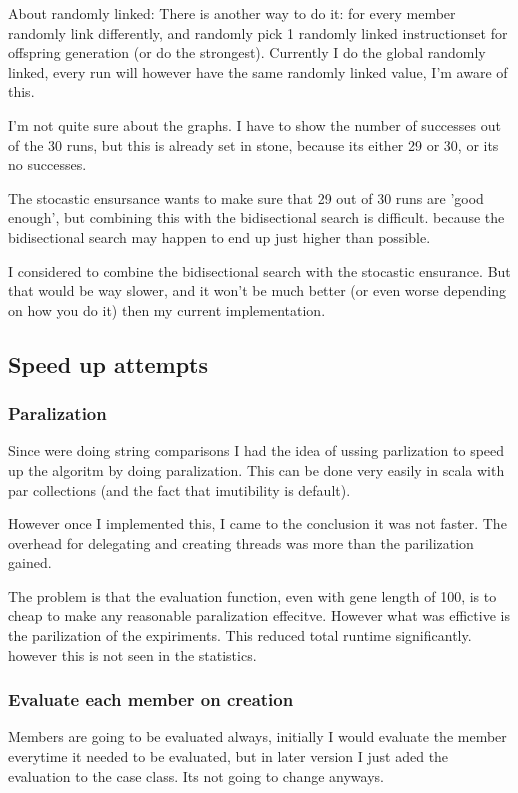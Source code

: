 \documentclass{article}
\begin{document}
About randomly linked:
	There is another way to do it: for every member randomly link
	differently, and randomly pick 1 randomly linked instructionset
	for offspring generation (or do the strongest).
	Currently I do the global randomly linked, every run will however
	have the same randomly linked value, I'm aware of this.

I'm not quite sure about the graphs. I have to show the number of successes
out of the 30 runs, but this is already set in stone, because its either
29 or 30, or its no successes.

The stocastic ensursance wants to make sure that 29 out of 30 runs are
'good enough', but combining this with the bidisectional search is difficult.
because the bidisectional search may happen to end up just higher than possible.

I considered to combine the bidisectional search with the stocastic ensurance.
But that would be way slower, and it won't be much better (or even worse depending
on how you do it) then my current implementation.


\subsection{Speed up attempts}
\subsubsection{Paralization}
Since were doing string comparisons I had the idea of ussing parlization to
speed up the algoritm by doing paralization. This can be done very easily
in scala with par collections (and the fact that imutibility is default).

However once I implemented this, I came to the conclusion it was not faster.
The overhead for delegating and creating threads was more than the parilization
gained.

The problem is that the evaluation function, even with gene length of 100, is
to cheap to make any reasonable paralization effecitve. However what was effictive
is the parilization of the expiriments. This reduced total runtime 
significantly. however this is not seen in the statistics.

\subsubsection{Evaluate each member on creation}
Members are going to be evaluated always, initially I would evaluate the member
everytime it needed to be evaluated, but in later version I just aded the
evaluation to the case class. Its not going to change anyways.
\end{document}
